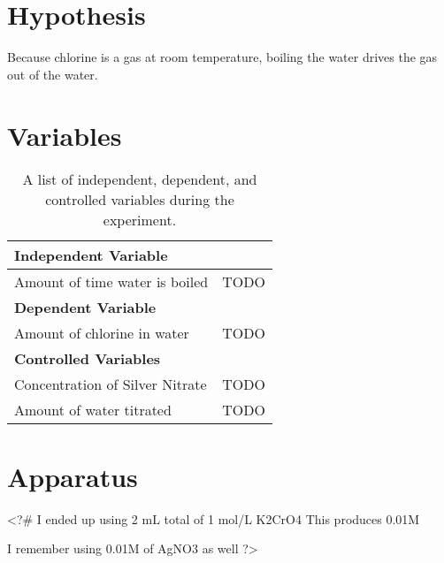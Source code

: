 \documentclass[12pt, demo]{article}
\begin{document}

\section*{Hypothesis}
Because chlorine is a gas at room temperature, boiling the water drives the gas out of the water.

\section*{Variables}

\begin{table}[H]
	\def\arraystretch{1.5}
	\caption{A list of independent, dependent, and controlled variables during the experiment.}
	\begin{tabularx}{\linewidth}{|X|X|}
		\hline
		\multicolumn{2}{|X|}{\centerline{\textbf{Independent Variable}}}
		\\\hline
		Amount of time water is boiled &
		TODO
		\\\hline
		\multicolumn{2}{|X|}{\centering \textbf{Dependent Variable}}
		\\\hline
		Amount of chlorine in water &
		TODO
		\\\hline
		\multicolumn{2}{|X|}{\centering \textbf{Controlled Variables}}
		\\\hline
		Concentration of Silver Nitrate &
		TODO
		\\\hline
		Amount of water titrated &
		TODO
		\\\hline
	\end{tabularx}
\end{table}

\section*{Apparatus}

<?#
I ended up using 2 mL total of 1 mol/L K2CrO4
This produces 0.01M

I remember using 0.01M of AgNO3 as well
?>
\end{document}
